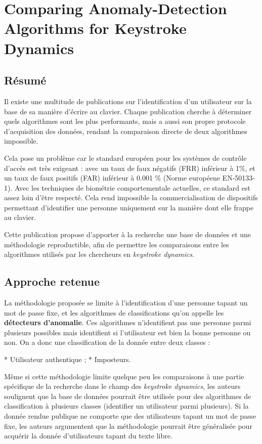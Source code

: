 \section{Comparing Anomaly-Detection Algorithms for Keystroke Dynamics\cite{killourhy2009}}


\subsection{Résumé}
Il existe une multitude de publications sur l'identification d'un utilisateur sur la base de sa manière d'écrire au clavier. Chaque publication cherche à déterminer quels algorithmes sont les plus performants, mais a aussi son propre protocole d'acquisition des données, rendant la comparaison directe de deux algorithmes impossible.

Cela pose un problème car le standard européen pour les systèmes de contrôle d'accès est très exigeant : avec un taux de faux négatifs (FRR) inférieur à 1\%, et un taux de faux positifs (FAR) inférieur à 0.001 \% (Norme européene \no EN-50133-1). Avec les techniques de biométrie comportementale actuelles, ce standard est assez loin d'être respecté. Cela rend impossible la commercialisation de dispositifs permettant d'identifier une personne uniquement sur la manière dont elle frappe au clavier.

Cette publication propose d'apporter à la recherche une base de données et une méthodologie reproductible, afin de permettre les comparaisons entre les algorithmes utilisés par les chercheurs en \textit{keystroke dynamics}.

\subsection{Approche retenue}
La méthodologie proposée se limite à l'identification d'une personne tapant un mot de passe fixe, et les algorithmes de classifications qu'on appelle les \textbf{détecteurs d'anomalie}. Ces algorithmes n'identifient pas une personne parmi plusieurs possibles mais identifient si l'utilisateur est bien la bonne personne ou non. On a donc une classification de la donnée entre deux classes :

* Utilisateur authentique ;
* Imposteurs.

Même si cette méthodologie limite quelque peu les comparaisons à une partie spécifique de la recherche dans le champ des \textit{keystroke dynamics}, les auteurs soulignent que la base de données pourrait être utilisée pour des algorithmes de classification à plusieurs classes (identifier un utilisateur parmi plusieurs). Si la donnée rendue publique ne comporte que des utilisateurs tapant un mot de passe fixe, les auteurs argumentent que la méthodologie pourrait être généralisée pour acquérir la donnée d'utilisateurs tapant du texte libre.

